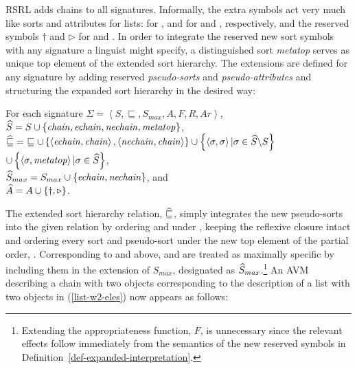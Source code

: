 \documentclass[output=paper
 	        ,biblatex
                ,babelshorthands
                ,newtxmath
                ,draftmode
                ,colorlinks, citecolor=brown
]{langscibook}
\begin{document}
{RSRL adds chains to all signatures.
Informally, the extra symbols act very much like sorts and attributes for
lists:  for ,  and  for
 and , respectively, and the reserved symbols
$\dagger$ and $\triangleright$ for  and .
In order to integrate the reserved new sort symbols with any
signature a linguist might specify, a distinguished sort \textit{metatop} serves as unique
top element of the extended sort hierarchy. The extensions are defined for
any signature by adding reserved \emph{pseudo-sorts} and \emph{pseudo-attributes}
and structuring the expanded sort hierarchy in the desired way:

\begin{mydef}\label{def-sig-chains}
For each signature $\Sigma=\left<S,\sqsubseteq,S_{max},A,F,R,Ar\right>$,\\
$\widehat{S}= S \cup \left\{\mathit{chain, echain, nechain, metatop}\right\}$,\\
$\Aug\sqsubseteq=\ \sqsubseteq\cup\left\{\left<\mathit{echain},\mathit{chain}\right>,\left<\mathit{nechain},\mathit{chain}\right>\right\}\cup\left\{\left<\sigma,\sigma\right>|\sigma\in\Aug{S}\backslash S\right\}$\\
\hspace*{.65cm}       $\cup\left\{\left<\sigma,\mathit{metatop}\right>|\sigma\in\widehat{S}\right\}$,\\
$\widehat{S}_{max}=S_{max}\cup\left\{\mathit{echain},\mathit{nechain}\right\}$, and\\
$\widehat{A}=A\cup\left\{\dagger,\triangleright\right\}$.
\end{mydef}

The extended sort hierarchy relation, $\widehat{\sqsubseteq}$, simply integrates the
new pseudo-sorts into the given relation by ordering  and
 under , keeping the reflexive closure intact
and ordering every sort and pseudo-sort under the new top element of the
partial order, . Corresponding to  and 
above,  and  are treated as maximally specific
by including them in the extension of $S_{max}$, designated as $\widehat{S}_{max}$.\footnote{Extending the appropriateness function, $F$, is unnecessary since the
  relevant effects follow immediately from the semantics of the new reserved symbols in
Definition~\ref{def-expanded-interpretation}.}
An AVM describing a chain with two  objects corresponding to the description
of a list with two  objects in (\ref{list-w2-eles}) now appears as
follows:

}
\end{document}
